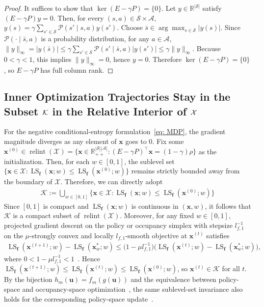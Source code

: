 \documentclass{article}
\newcommand{\bx}{\mathbf{x}}
\newcommand{\bu}{\mathbf{u}}
\newcommand{\X}{\mathcal{X}}
\newcommand{\LS}{\operatorname{LS}}
\newcommand{\f}{\mathbf{f}}
\begin{document}
\begin{proof}
It suffices to show that
$\ker(E-\gamma P)=\{0\}$.
Let $y\in\mathbb R^{|\mathcal S|}$ satisfy
$
(E-\gamma P)y=0.
$
Then, for every $(s,a)\in\mathcal S\times\mathcal A$,
$
y(s)=\gamma\sum_{s'\in\mathcal S}\mathcal P(s'\mid s,a) y(s').
$
Choose $\bar s\in\arg\max_{s\in\mathcal S}|y(s)|$. Since
$\mathcal P(\cdot\mid \bar s,a)$ is a probability distribution, for any
$a\in\mathcal A$,
$
\|y\|_\infty
=
|y(\bar s)|
\le
\gamma\sum_{s'\in\mathcal S}\mathcal P(s'\mid \bar s,a) |y(s')|
\le
\gamma \|y\|_\infty .
$
Because $0<\gamma<1$, this implies $\|y\|_\infty=0$, hence $y=0$.
Therefore $\ker(E-\gamma P)=\{0\}$, so $E-\gamma P$ has full column rank.
\end{proof}

\subsection{Inner Optimization Trajectories
Stay in the Subset $\cal K$ in the Relative Interior of $\cal X$}
\label{app:PGD_trajectory}
For the negative conditional-entropy formulation~\eqref{eq: MDP}, the gradient magnitude diverges as any element of $\bx$ goes to $0$. Fix some $\bx^{(0)}\in \operatorname{relint}(\X)=\{\bx\in\mathbb R_{++}^{|\mathcal S||\mathcal A|}:(E-\gamma P)^\top\bx=(1-\gamma)\rho\}$ as the initialization. Then, for each $w\in[0,1]$, the sublevel set $\{\bx\in\X:\LS_{\f}(\bx;w)\le \LS_{\f}(\bx^{(0)};w)\}$ remains strictly bounded away from the boundary of $\X$. Therefore, we can directly adopt
\begin{align}
\mathcal K:=\bigcup_{w\in[0,1]}\{\bx\in\X:\LS_{\f}(\bx;w)\le \LS_{\f}(\bx^{(0)};w)\} \label{eq:level_set}
\end{align}
Since $[0,1]$ is compact and $\LS_{\f}(\bx;w)$ is continuous in $(\bx,w)$, it follows that $\mathcal K$ is a compact subset of $\operatorname{relint}(\X)$. Moreover, for any fixed $w\in[0,1]$, projected gradient descent {on the policy or occupancy simplex} with stepsize $l_{f,1}^{-1}$ on the $\mu$-strongly convex and {locally} $l_{f,1}$-smooth objective  at $\bx^{(t)}$ satisfies
\begin{align}
\LS_{\f}(\bx^{(t+1)};w)-\LS_{\f}(\bx_w^*;w)
\le
\big(1-\mu l_{f,1}^{-1}\big)
\big(\LS_{\f}(\bx^{(t)};w)-\LS_{\f}(\bx_w^*;w)\big), \label{eq:PGD_contraction}
\end{align}
where $0<1-\mu l_{f,1}^{-1}<1$~\citep{fatkhullin2025stochastic}. Hence $\LS_{\f}(\bx^{(t+1)};w)\le \LS_{\f}(\bx^{(t)};w)\le \LS_{\f}(\bx^{(0)};w)$, so $\bx^{(t)}\in \mathcal K$ for all $t$. By the bijection $h_m(\bu)=f_m(g(\bu))$ and the equivalence between policy-space and occupancy-space optimization~\citep{schlaginhaufen2024towards}, the same sublevel-set invariance also holds for the corresponding policy-space update~\citep{fatkhullin2025stochastic}.
\end{document}
